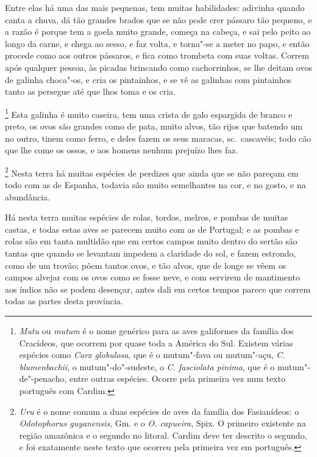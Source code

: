  Entre elas há uma das mais pequenas, tem muitas habilidades: adivinha
quando canta a chuva, dá tão grandes brados que se não pode crer pássaro
tão pequeno, e a razão é porque tem a goela muito grande, começa na
cabeça, e sai pelo peito ao longo da carne, e chega ao sesso, e faz
volta, e torna"-se a meter no papo, e então procede como aos outros
pássaros, e fica como trombeta com suas voltas. Correm após qualquer
pessoa, às picadas brincando como cachorrinhos, se lhe deitam ovos de
galinha choca"-os, e cria os pintainhos, e se vê as galinhas com
pintainhos tanto as persegue até que lhos toma e os cria. 

\footnote{ \textit{Mutu} ou \textit{mutum} é o nome
genérico para as aves galiformes da família dos Cracídeos, que ocorrem
por quase toda a América do Sul. Existem várias espécies como
\textit{Carx globulosa}, que é o mutum"-fava ou mutum"-açu, \textit{C.
blumenbachii}, o mutum"-do"-sudeste, o \textit{C. fasciolata pinima}, que
é o mutum"-de"-penacho, entre outras espécies. Ocorre pela primeira vez
num texto português com Cardim.} Esta galinha é muito
caseira, tem uma crista de galo espargida de branco e preto, os ovos
são grandes como de pata, muito alvos, tão rijos que batendo um no
outro, tinem como ferro, e deles fazem os seus maracas, sc.~cascavéis;
todo cão que lhe come os ossos, e aos homens nenhum prejuízo lhes faz. 

\footnote{ \textit{Uru} é o nome comum a duas espécies
de aves da família dos Fasianídeos: o \textit{Odotophorus guyanensis}, 
Gm. e o \textit{O. capueira}, Spix. O primeiro existente na região
amazônica e o segundo no litoral. Cardim deve ter descrito o segundo, e
foi exatamente neste texto que ocorreu pela primeira vez em
português.} Nesta terra há muitas espécies de perdizes que
ainda que se não pareçam em todo com as de Espanha, todavia são muito
semelhantes na cor, e no gosto, e na abundância. 

 Há nesta terra muitas espécies de rolas, tordos, melros, e pombas de
muitas castas, e todas estas aves se parecem muito com as de Portugal;
e as pombas e rolas são em tanta multidão que em certos campos muito
dentro do sertão são tantas que quando se levantam impedem a claridade
do sol, e fazem estrondo, como de um trovão; põem tantos ovos, e tão
alvos, que de longe se vêem os campos alvejar com os ovos como se fosse
neve, e com servirem de mantimento aos índios não se podem desençar,
antes dali em certos tempos parece que correm todas as partes desta província. 

